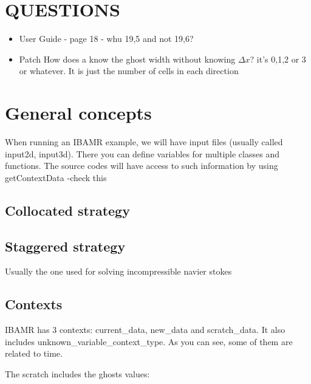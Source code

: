 \documentclass[12pt,a4paper,twoside]{article}
\begin{document}
\section{QUESTIONS}

\begin{itemize}
    \item  User Guide - page 18 - whu 19,5 and not 19,6?
    \item Patch How does a know the ghost width without knowing $\Delta x$? 
    it's 0,1,2 or 3 or whatever. It is just the number of cells in each direction
\end{itemize}

\section{General concepts}
When running an IBAMR example, we will have input files (usually called input2d, input3d). There you can define variables for multiple classes and functions. 
The source codes will have access to such information by using {\color{red} getContextData -check this} 

\subsection{Collocated strategy}

\subsection{Staggered strategy}
Usually the one used for solving incompressible navier stokes

\subsection{Contexts}
IBAMR has $3$ contexts: current\_data, new\_data and scratch\_data. It also includes unknown\_variable\_context\_type. 
As you can see, some of them are related to time. 

The scratch includes the ghosts values:

\end{document}
